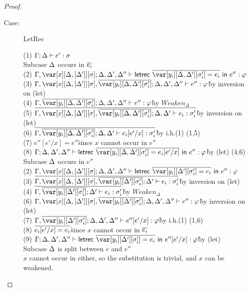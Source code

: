 \begin{proof}
\begin{description}
\item[Case:] LetRec
\begin{tabbing}
    (1) $\Gamma; \Delta \vdash e' : \sigma$\\
    Subcase $\Delta$ occurs in $\overline{e_i}$\\
    (2) $\G,\xD; \D, \D', \D'' \vdash \lletrec{\ov{\var[y_i][\D,\D'][\s_i'] = e_i}}{e''} : \vp$\\
    (3) $\G,\xD,\ov{\var[y_i][\D,\D'][\s'_i]}; \D,\D',\D'' \vdash e'' : \vp$\` by inversion on (let)\\
    (4) $\G,\ov{\var[y_i][\D,\D'][\s'_i]}; \D,\D',\D'' \vdash e'' : \vp$\` by $Weaken_\Delta$\\
    (5) $\ov{\G,\xD,\ov{\var[y_i][\D,\D'][\s'_i]}; \D, \D' \vdash e_i : \s'_i}$\` by inversion on (let)\\
    (6) $\ov{\G,\ov{\var[y_i][\D,\D'][\s'_i]}; \D,\D' \vdash e_i[e'/x] : \s'_i}$\` by i.h.(1) (1,5)\\
    (7) $e''[e'/x] = e''$\` since $x$ cannot occur in $e''$\\
    (8) $\G; \D,\D',\D'' \vdash \lletrec{\ov{\var[y_i][\D,\D'][\s_i'] = e_i[e'/x]}}{e''} : \vp$\` by (let) (4,6)\\
    Subcase $\Delta$ occurs in $e''$\\
    (2) $\G, \xD; \D, \D', \D'' \vdash \lletrec{\ov{\var[y_i][\D'][\s_i'] = e_i}}{e''} : \vp$\\
    (3) $\ov{\G,\xD,\ov{\var[y_i][\D'][\s'_i]}; \D' \vdash e_i : \s'_i}$\` by inversion on (let)\\
    (4) $\ov{\G,\ov{\var[y_i][\D'][\s'_i]}; \D' \vdash e_i : \s'_i}$\` by $Weaken_\Delta$\\
    (6) $\G,\xD,\ov{\var[y_i][\D'][\s'_i]}; \D,\D',\D'' \vdash e'' : \vp$\` by inversion on (let)\\
    (7) $\G,\ov{\var[y_i][\D'][\s'_i]}; \D,\D',\D'' \vdash e''[e'/x] :
    \vp$\` by i.h.(1) (1,6)\\
    (8) $\overline{e_i[e'/x] = e_i}$\` since $x$ cannot occur in $\overline{e_i}$\\
    (9) $\G;\D,\D',\D'' \vdash \lletrec{\ov{\var[y_i][\D'][\s'_i] = e_i}}{e''[e'/x]} : \vp$\` by (let)\\
    Subcase $\Delta$ is split between $e$ and $e''$\\
    $x$ cannot occur in either, so the substitution is trivial, and $x$ can be weakened.
\end{tabbing}


\end{description}
\end{proof}
